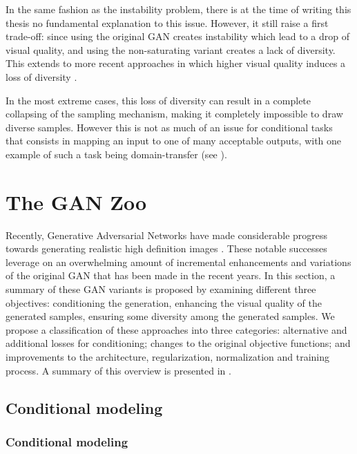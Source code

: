 In the same fashion as the instability problem, there is at the time of writing this thesis no fundamental explanation to this issue. However, it still raise a first trade-off: since using the original \ac{GAN} creates instability which lead to a drop of visual quality, and using the non-saturating variant creates a lack of diversity. This extends to more recent approaches in which higher visual quality induces a loss of diversity \citep{Brock2018}.

In the most extreme cases, this loss of diversity can result in a complete collapsing of the sampling mechanism, making it completely impossible to draw diverse samples. However this is not as much of an issue for conditional tasks that consists in mapping an input to one of many acceptable outputs, with one example of such a task being domain-transfer (see ). 



\section{The GAN Zoo}

Recently, Generative Adversarial Networks have made considerable progress towards generating realistic high definition images \citep{Brock2018, Karras2020, Wang2018b}. These notable successes leverage on an overwhelming amount of incremental enhancements and variations of the original GAN \citep{Hindupur2017} that has been made in the recent years. In this section, a summary of these GAN variants is proposed by examining different three objectives: conditioning the generation, enhancing the visual quality of the generated samples, ensuring some diversity among the generated samples. We propose a classification of these approaches into three categories: alternative and additional losses for conditioning;  changes to the original objective functions; and improvements to the  architecture, regularization, normalization and training process. A summary of this overview is presented in .


\subsection{Conditional modeling}


\subsubsection{Conditional modeling}
\label{subs:CGAN}

